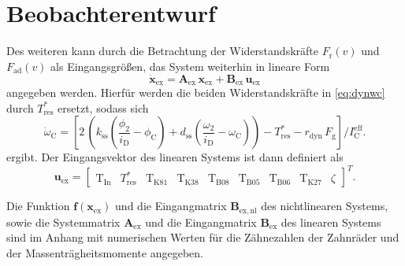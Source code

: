 \chapter{Beobachterentwurf}\label{ch:ch3}


Des weiteren kann durch die Betrachtung der Widerstandskräfte $F_\mathrm{r}(v)$ und $F_\mathrm{ad}(v)$ als Eingangsgrößen, das System weiterhin in lineare Form
\begin{equation}\label{eq:sys_linex}
\dot{\pmb{x}}_\mathrm{ex} = \pmb{A}_\mathrm{ex}\,\pmb{x}_\mathrm{ex} + \pmb{B}_\mathrm{ex}\,\pmb{u}_\mathrm{ex}
\end{equation}
angegeben werden. Hierfür werden die beiden Widerstandskräfte in \eqref{eq:dynwc} durch $T^*_\mathrm{res}$ ersetzt, sodass sich 
\begin{equation}\label{eq:dynwc_lin}
\dot{\omega}_\mathrm{C} = \left[ 2\,\left(k_\mathrm{ss}\left(\frac{\phi_2}{i_{\mathrm{D}}} - \phi_\mathrm{C}\right) + d_\mathrm{ss}\left(\frac{\omega_2}{i_{\mathrm{D}}} - \omega_\mathrm{C}\right)\right) - T^*_\mathrm{res} - r_\mathrm{dyn}\, F_\mathrm{g}\right]/I^\mathrm{eff}_\mathrm{C}.
\end{equation}
 ergibt. Der Eingangsvektor des linearen Systems ist dann definiert als 
\begin{equation}
\pmb{u}_\mathrm{ex} = \begin{bmatrix} \mathrm{T}_{\mathrm{In}} & T^*_\mathrm{res} & \mathrm{T}_{\mathrm{K81}} & \mathrm{T}_{\mathrm{K38}} & \mathrm{T}_{\mathrm{B08}} & \mathrm{T}_{\mathrm{B05}} & \mathrm{T}_{\mathrm{B06}} & \mathrm{T}_{\mathrm{K27}} & \zeta \end{bmatrix}^T.
\end{equation}

Die Funktion $\pmb{f}(\pmb{x}_\mathrm{ex})$ und die Eingangmatrix $\pmb{B}_\mathrm{ex,nl}$ des nichtlinearen Systems, sowie die Systemmatrix $\pmb{A}_\mathrm{ex}$ und die Eingangmatrix $\pmb{B}_\mathrm{ex}$ des linearen Systems sind im Anhang mit numerischen Werten für die Zähnezahlen der Zahnräder und der Massenträgheitsmomente angegeben.



